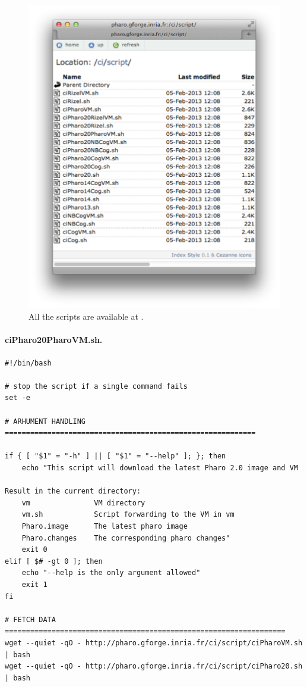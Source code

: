 \documentclass[a4paper,10pt,twoside]{book}
\begin{document}
\begin{figure}[!h]
	\centering
	\includegraphics[width=\textwidth]{webSite}
	\caption{All the scripts are available at  \label{fig:website}.}
\end{figure}
	



\paragraph{ciPharo20PharoVM.sh.}

\begin{scriptsize}
\begin{verbatim}
#!/bin/bash

# stop the script if a single command fails
set -e 

# ARHUMENT HANDLING ===========================================================

if { [ "$1" = "-h" ] || [ "$1" = "--help" ]; }; then
    echo "This script will download the latest Pharo 2.0 image and VM

Result in the current directory:
    vm               VM directory
    vm.sh            Script forwarding to the VM in vm
    Pharo.image      The latest pharo image
    Pharo.changes    The corresponding pharo changes"
    exit 0
elif [ $# -gt 0 ]; then
    echo "--help is the only argument allowed"
    exit 1
fi

# FETCH DATA ==================================================================
wget --quiet -qO - http://pharo.gforge.inria.fr/ci/script/ciPharoVM.sh | bash
wget --quiet -qO - http://pharo.gforge.inria.fr/ci/script/ciPharo20.sh | bash
\end{verbatim}
\end{scriptsize}
\end{document}
